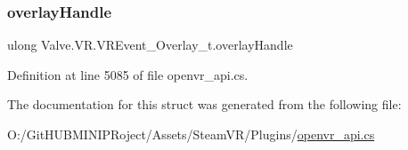 \subsubsection{\texorpdfstring{overlayHandle}{overlayHandle}}
{\footnotesize\ttfamily ulong Valve.\+V\+R.\+V\+R\+Event\+\_\+\+Overlay\+\_\+t.\+overlay\+Handle}



Definition at line 5085 of file openvr\+\_\+api.\+cs.



The documentation for this struct was generated from the following file\+:\begin{DoxyCompactItemize}
\item 
O\+:/\+Git\+H\+U\+B\+M\+I\+N\+I\+P\+Roject/\+Assets/\+Steam\+V\+R/\+Plugins/\mbox{\hyperlink{openvr__api_8cs}{openvr\+\_\+api.\+cs}}\end{DoxyCompactItemize}
